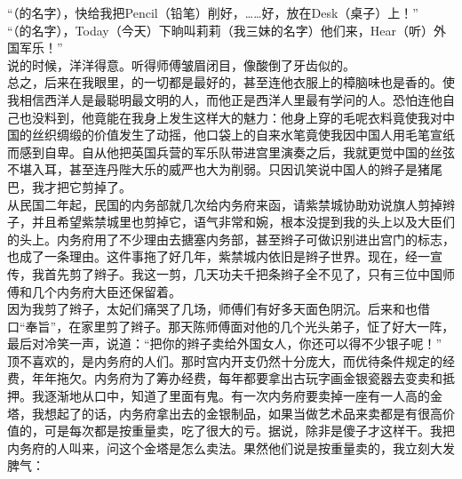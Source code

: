“（的名字），快给我把Pencil（铅笔）削好，……好，放在Desk（桌子）上！”\\

“（的名字），Today（今天）下晌叫莉莉（我三妹的名字）他们来，Hear（听）外国军乐！”\\

说的时候，洋洋得意。听得师傅皱眉闭目，像酸倒了牙齿似的。\\

总之，后来在我眼里，的一切都是最好的，甚至连他衣服上的樟脑味也是香的。使我相信西洋人是最聪明最文明的人，而他正是西洋人里最有学问的人。恐怕连他自己也没料到，他竟能在我身上发生这样大的魅力：他身上穿的毛呢衣料竟使我对中国的丝织绸缎的价值发生了动摇，他口袋上的自来水笔竟使我因中国人用毛笔宣纸而感到自卑。自从他把英国兵营的军乐队带进宫里演奏之后，我就更觉中国的丝弦不堪入耳，甚至连丹陛大乐的威严也大为削弱。只因讥笑说中国人的辫子是猪尾巴，我才把它剪掉了。\\

从民国二年起，民国的内务部就几次给内务府来函，请紫禁城协助劝说旗人剪掉辫子，并且希望紫禁城里也剪掉它，语气非常和婉，根本没提到我的头上以及大臣们的头上。内务府用了不少理由去搪塞内务部，甚至辫子可做识别进出宫门的标志，也成了一条理由。这件事拖了好几年，紫禁城内依旧是辫子世界。现在，经一宣传，我首先剪了辫子。我这一剪，几天功夫千把条辫子全不见了，只有三位中国师傅和几个内务府大臣还保留着。\\

因为我剪了辫子，太妃们痛哭了几场，师傅们有好多天面色阴沉。后来和也借口“奉旨”，在家里剪了辫子。那天陈师傅面对他的几个光头弟子，怔了好大一阵，最后对冷笑一声，说道：“把你的辫子卖给外国女人，你还可以得不少银子呢！”\\

顶不喜欢的，是内务府的人们。那时宫内开支仍然十分庞大，而优待条件规定的经费，年年拖欠。内务府为了筹办经费，每年都要拿出古玩字画金银瓷器去变卖和抵押。我逐渐地从口中，知道了里面有鬼。有一次内务府要卖掉一座有一人高的金塔，我想起了的话，内务府拿出去的金银制品，如果当做艺术品来卖都是有很高价值的，可是每次都是按重量卖，吃了很大的亏。据说，除非是傻子才这样干。我把内务府的人叫来，问这个金塔是怎么卖法。果然他们说是按重量卖的，我立刻大发脾气：\\

